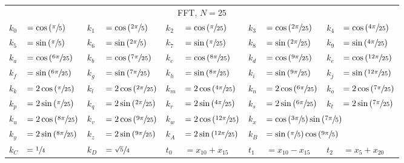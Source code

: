 \begin{tabular}{|p{4.3pt}l|p{4.3pt}l|p{4.3pt}l|p{4.3pt}l|p{4.3pt}l|}\toprule \multicolumn{10}{|c|}{FFT, $N=25$} \\
$k_0 $ &$= \cos\left(\sfrac{\pi}{5}\right)$ & $k_1 $ &$= \cos\left(\sfrac{2\pi}{5}\right)$ & $k_2 $ &$= \cos\left(\sfrac{\pi}{25}\right)$ & $k_3 $ &$= \cos\left(\sfrac{2\pi}{25}\right)$ & $k_4 $ &$= \cos\left(\sfrac{4\pi}{25}\right)$\\ 
$k_5 $ &$= \sin\left(\sfrac{\pi}{5}\right)$ & $k_6 $ &$= \sin\left(\sfrac{2\pi}{5}\right)$ & $k_7 $ &$= \sin\left(\sfrac{\pi}{25}\right)$ & $k_8 $ &$= \sin\left(\sfrac{2\pi}{25}\right)$ & $k_9 $ &$= \sin\left(\sfrac{4\pi}{25}\right)$\\ 
$k_a $ &$= \cos\left(\sfrac{6\pi}{25}\right)$ & $k_b $ &$= \cos\left(\sfrac{7\pi}{25}\right)$ & $k_c $ &$= \cos\left(\sfrac{8\pi}{25}\right)$ & $k_d $ &$= \cos\left(\sfrac{9\pi}{25}\right)$ & $k_e $ &$= \cos\left(\sfrac{12\pi}{25}\right)$\\ 
$k_f $ &$= \sin\left(\sfrac{6\pi}{25}\right)$ & $k_g $ &$= \sin\left(\sfrac{7\pi}{25}\right)$ & $k_h $ &$= \sin\left(\sfrac{8\pi}{25}\right)$ & $k_i $ &$= \sin\left(\sfrac{9\pi}{25}\right)$ & $k_j $ &$= \sin\left(\sfrac{12\pi}{25}\right)$\\ 
$k_k $ &$= 2\cos\left(\sfrac{\pi}{25}\right)$ & $k_l $ &$= 2\cos\left(\sfrac{2\pi}{25}\right)$ & $k_m $ &$= 2\cos\left(\sfrac{4\pi}{25}\right)$ & $k_n $ &$= 2\cos\left(\sfrac{6\pi}{25}\right)$ & $k_o $ &$= 2\cos\left(\sfrac{7\pi}{25}\right)$\\ 
$k_p $ &$= 2\sin\left(\sfrac{\pi}{25}\right)$ & $k_q $ &$= 2\sin\left(\sfrac{2\pi}{25}\right)$ & $k_r $ &$= 2\sin\left(\sfrac{4\pi}{25}\right)$ & $k_s $ &$= 2\sin\left(\sfrac{6\pi}{25}\right)$ & $k_t $ &$= 2\sin\left(\sfrac{7\pi}{25}\right)$\\ 
$k_u $ &$= 2\cos\left(\sfrac{8\pi}{25}\right)$ & $k_v $ &$= 2\cos\left(\sfrac{9\pi}{25}\right)$ & $k_w $ &$= 2\cos\left(\sfrac{12\pi}{25}\right)$ & $k_x $ &\multicolumn{3}{l|}{$= \cos\left(\sfrac{3\pi}{5}\right)\sin\left(\sfrac{7\pi}{5}\right)$}\\ 
$k_y $ &$= 2\sin\left(\sfrac{8\pi}{25}\right)$ & $k_z $ &$= 2\sin\left(\sfrac{9\pi}{25}\right)$ & $k_A $ &$= 2\sin\left(\sfrac{12\pi}{25}\right)$ & $k_B $ &\multicolumn{3}{l|}{$= \sin\left(\sfrac{\pi}{5}\right)\cos\left(\sfrac{9\pi}{5}\right)$}\\ 
$k_C $ &$= \sfrac{1}{4}$ & $k_D $ &$= \sfrac{\sqrt{5}}{4}$ & $t_0 $ &$= x_{10} + x_{15}$ & $t_1 $ &$= x_{10} - x_{15}$ & $t_2 $ &$= x_5 + x_{20}$\\ 

\end{tabular}
